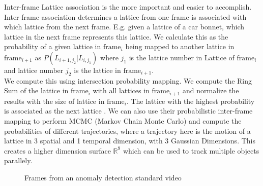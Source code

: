 \documentclass{article}
\begin{document}
Inter-frame Lattice association is the more important and easier to accomplish. Inter-frame association determines a lattice from one frame is associated with which lattice from the next frame. E.g.  given a lattice of a car bonnet, which lattice in the next frame represents this lattice. We calculate this as the probability of a given lattice in $\text{frame}_i$ being mapped to another lattice in $\text{frame}_{i+1}$ as $P(L_{i + 1, j_2} | L_{i, j_1})$ where $j_1$ is the lattice number in Lattice of $\text{frame}_i$ and lattice number $j_2$ is the lattice in $\text{frame}_{i + 1}$. \\

We compute this using intersection probability mapping. We compute the Ring Sum of the lattice in $\text{frame}_i$ with all lattices in $\text{frame}_{i + 1}$ and normalize the results with the size of lattice in $\text{frame}_i$. The lattice with the highest probability is associated as the next lattice . We can also use their probabilistic inter-frame mapping to perform MCMC (Markov Chain Monte Carlo) and compute the probabilities of different trajectories, where a trajectory here is the motion of a lattice in 3 spatial and 1 temporal dimension, with 3 Gaussian Dimensions. This creates a higher dimension surface $\mathbb{R}^9$ which can be used to track multiple objects parallely.

\begin{figure}[ht]
    \centering
    \qquad
    \qquad
    \qquad
    \qquad
    \qquad
    \qquad
    \qquad
    \caption{ Frames from an anomaly detection standard video \cite{idiap} \label{fig:object-tracking-video-frame-1-6}}
\end{figure}
\end{document}
